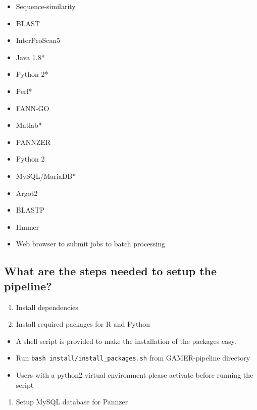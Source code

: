 \documentclass[11pt,letterpaper]{article}
\begin{document}
\begin{itemize}
 \item
       Sequence-similarity
 \item
       BLAST
 \item
       InterProScan5
 \item
       Java 1.8*
 \item
       Python 2*
 \item
       Perl*
 \item
       FANN-GO
 \item
       Matlab*
 \item
       PANNZER
 \item
       Python 2
 \item
       MySQL/MariaDB*
 \item
       Argot2
 \item
       BLASTP
 \item
       Hmmer
 \item
       Web browser to submit jobs to batch processing
\end{itemize}



\subsection{What are the steps needed to setup the pipeline?}\label{what-are-the-steps-needed-to-setup-the-pipeline}

\begin{enumerate}
 \def\labelenumi{\arabic{enumi}.}
 \tightlist
 \item
       Install dependencies
 \item
       Install required packages for R and Python
\end{enumerate}

\begin{itemize}
 \tightlist
 \item
       A shell script is provided to make the installation of the packages
       easy.
 \item
       Run \texttt{bash\ install/install\_packages.sh} from GAMER-pipeline
       directory
 \item
       Users with a python2 virtual environment please activate before
       running the script
\end{itemize}

\begin{enumerate}
 \def\labelenumi{\arabic{enumi}.}
 \setcounter{enumi}{2}
 \tightlist
 \item
       Setup MySQL database for Pannzer
\end{enumerate}
\end{document}
